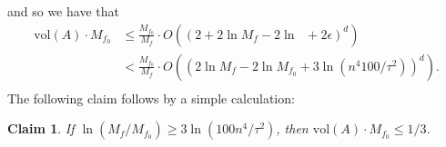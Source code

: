 \documentclass[final,12pt]{colt2018}
\newtheorem{informal theorem}[theorem]{Theorem (informal statement)}
\newtheorem{claim}[theorem]{Claim}
\newcommand{\eps}{\epsilon}
\newcommand{\pmin}{\mathop{p_{\mathrm{min}}}}
\newcommand{\vol}{\mathrm{vol}}
\begin{document}
and so we have that
\begin{align*}
\vol(A) \cdot M_{f_0} &\leq \frac{M_{f_0}}{M_f} \cdot O\left( \left(2 + 2\ln M_f - 2\ln \pmin + 2\eps \right)^d \right) \\
&< \frac{M_{f_0}}{M_f} \cdot O\left( \left(2\ln M_f - 2\ln M_{f_0} + 3\ln(n^4 100/\tau^2) \right)^d \right). \\
\end{align*}
The following claim follows by a simple calculation:
\begin{claim}\label{claim:m_f_2}
 {If $\ln(M_f / M_{f_0}) \geq 3\ln(100n^4/\tau^2)$, then $\vol(A) \cdot M_{f_0} \leq 1/3$.}
\end{claim}
\end{document}
